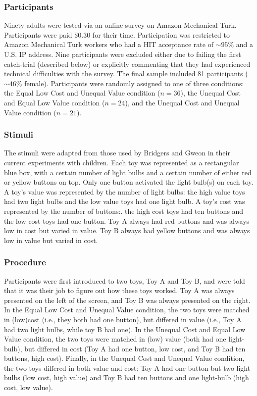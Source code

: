 \documentclass[10pt,letterpaper]{article}
\begin{document}
\subsubsection{Participants}

Ninety adults were tested via an online survey on Amazon Mechanical Turk. Participants were paid \$0.30 for their time. Participation was restricted to Amazon Mechanical Turk workers who had a HIT acceptance rate of $\sim 95\%$ and a U.S. IP address. Nine participants were excluded either due to failing the first catch-trial (described below) or explicitly commenting that they had experienced technical difficulties with the survey. The final sample included 81 participants ($\sim 46\%$ female). Participants were randomly assigned to one of three conditions: the Equal Low Cost and Unequal Value condition ($n = 36$), the Unequal Cost and Equal Low Value condition ($n = 24$), and the Unequal Cost and Unequal Value condition ($n = 21$). 

\subsubsection{Stimuli}

The stimuli were adapted from those used by Bridgers and Gweon in their current experiments with children. Each toy was represented as a rectangular blue box, with a certain number of light bulbs and a certain number of either red or yellow buttons on top. Only one button activated the light bulb(s) on each toy. A toy's value was represented by the number of light bulbs: the high value toys had two light bulbs and the low value toys had one light bulb. A toy's cost was represented by the number of buttons:. the high cost toys had ten buttons and the low cost toys had one button. Toy A always had red buttons and was always low in cost but varied in value. Toy B always had yellow buttons and was always low in value but varied in cost.

\subsubsection{Procedure}

Participants were first introduced to two toys, Toy A and Toy B, and were told that it was their job to figure out how these toys worked. Toy A was always presented on the left of the screen, and Toy B was always presented on the right. In the Equal Low Cost and Unequal Value condition, the two toys were matched in (low)cost (i.e., they both had one button), but differed in value (i.e., Toy A had two light bulbs, while toy B had one). In the Unequal Cost and Equal Low Value condition, the two toys were matched in (low) value (both had one light-bulb), but differed in cost (Toy A had one button, low cost, and Toy B had ten buttons, high cost). Finally, in the Unequal Cost and Unequal Value condition, the two toys differed in both value and cost: Toy A had one button but two light-bulbs (low cost, high value) and Toy B had ten buttons and one light-bulb (high cost, low value). 
\end{document}
